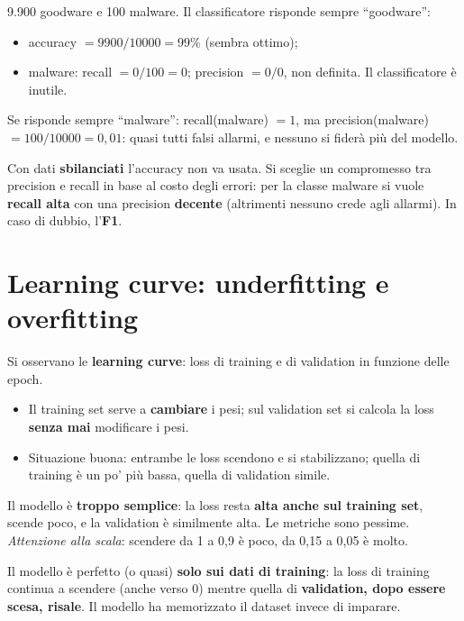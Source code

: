 \begin{esempio}
9.900 goodware e 100 malware. Il classificatore risponde sempre ``goodware'':
\begin{itemize}
  \item accuracy $= 9900/10000 = 99\%$ (sembra ottimo);
  \item malware: recall $= 0/100 = 0$; precision $= 0/0$, non definita. Il classificatore è inutile.
\end{itemize}
Se risponde sempre ``malware'': recall(malware) $= 1$, ma precision(malware) $= 100/10000 = 0{,}01$: quasi tutti falsi
allarmi, e nessuno si fiderà più del modello.
\end{esempio}

\begin{esame}
Con dati \textbf{sbilanciati} l'accuracy non va usata. Si sceglie un compromesso tra precision e recall in base al costo
degli errori: per la classe malware si vuole \textbf{recall alta} con una precision \textbf{decente} (altrimenti nessuno
crede agli allarmi). In caso di dubbio, l'\textbf{F1}.
\end{esame}

\section{Learning curve: underfitting e overfitting}
Si osservano le \textbf{learning curve}: loss di training e di validation in funzione delle epoch.
\begin{itemize}
  \item Il training set serve a \textbf{cambiare} i pesi; sul validation set si calcola la loss \textbf{senza mai} modificare i pesi.
  \item Situazione buona: entrambe le loss scendono e si stabilizzano; quella di training è un po' più bassa, quella di
        validation simile.
\end{itemize}

\begin{definizione}[underfitting]
Il modello è \textbf{troppo semplice}: la loss resta \textbf{alta anche sul training set}, scende poco, e la validation è
similmente alta. Le metriche sono pessime. \emph{Attenzione alla scala}: scendere da 1 a 0,9 è poco, da 0,15 a 0,05 è molto.
\end{definizione}

\begin{definizione}[overfitting]
Il modello è perfetto (o quasi) \textbf{solo sui dati di training}: la loss di training continua a scendere (anche verso 0)
mentre quella di \textbf{validation, dopo essere scesa, risale}. Il modello ha memorizzato il dataset invece di imparare.
\end{definizione}

